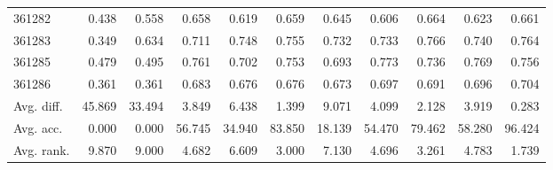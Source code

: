 \begin{tabular}{lrrrrrrrrrr}
361282 & 0.438 & 0.558 & 0.658 & 0.619 & 0.659 & 0.645 & 0.606 & 0.664 & 0.623 & 0.661 \\
361283 & 0.349 & 0.634 & 0.711 & 0.748 & 0.755 & 0.732 & 0.733 & 0.766 & 0.740 & 0.764 \\
361285 & 0.479 & 0.495 & 0.761 & 0.702 & 0.753 & 0.693 & 0.773 & 0.736 & 0.769 & 0.756 \\
361286 & 0.361 & 0.361 & 0.683 & 0.676 & 0.676 & 0.673 & 0.697 & 0.691 & 0.696 & 0.704 \\
Avg. diff. & 45.869 & 33.494 & 3.849 & 6.438 & 1.399 & 9.071 & 4.099 & 2.128 & 3.919 & 0.283 \\
Avg. acc. & 0.000 & 0.000 & 56.745 & 34.940 & 83.850 & 18.139 & 54.470 & 79.462 & 58.280 & 96.424 \\
Avg. rank. & 9.870 & 9.000 & 4.682 & 6.609 & 3.000 & 7.130 & 4.696 & 3.261 & 4.783 & 1.739 \\
\bottomrule
\end{tabular}
